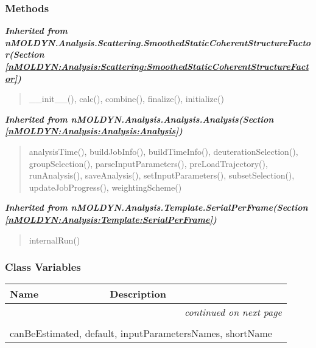 
  \subsubsection{Methods}


\large{\textbf{\textit{Inherited from nMOLDYN.Analysis.Scattering.SmoothedStaticCoherentStructureFactor\textit{(Section \ref{nMOLDYN:Analysis:Scattering:SmoothedStaticCoherentStructureFactor})}}}}

\begin{quote}
\_\_init\_\_(), calc(), combine(), finalize(), initialize()
\end{quote}

\large{\textbf{\textit{Inherited from nMOLDYN.Analysis.Analysis.Analysis\textit{(Section \ref{nMOLDYN:Analysis:Analysis:Analysis})}}}}

\begin{quote}
analysisTime(), buildJobInfo(), buildTimeInfo(), deuterationSelection(), groupSelection(), parseInputParameters(), preLoadTrajectory(), runAnalysis(), saveAnalysis(), setInputParameters(), subsetSelection(), updateJobProgress(), weightingScheme()
\end{quote}

\large{\textbf{\textit{Inherited from nMOLDYN.Analysis.Template.SerialPerFrame\textit{(Section \ref{nMOLDYN:Analysis:Template:SerialPerFrame})}}}}

\begin{quote}
internalRun()
\end{quote}


  \subsubsection{Class Variables}

    \vspace{-1cm}
\hspace{\varindent}\begin{longtable}{|p{\varnamewidth}|p{\vardescrwidth}|l}
\cline{1-2}
\cline{1-2} \centering \textbf{Name} & \centering \textbf{Description}& \\
\cline{1-2}
\endhead\cline{1-2}\multicolumn{3}{r}{\small\textit{continued on next page}}\\\endfoot\cline{1-2}
\endlastfoot\multicolumn{2}{|l|}{\textit{Inherited from nMOLDYN.Analysis.Scattering.SmoothedStaticCoherentStructureFactor \textit{(Section \ref{nMOLDYN:Analysis:Scattering:SmoothedStaticCoherentStructureFactor})}}}\\
\multicolumn{2}{|p{\varwidth}|}{\raggedright canBeEstimated, default, inputParametersNames, shortName}\\
\cline{1-2}
\end{longtable}


